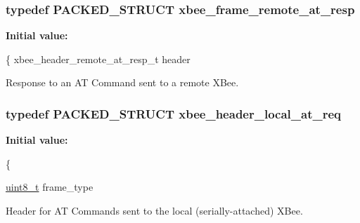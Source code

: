 \hypertarget{group__xbee__atcmd_ga5c11edcb9c5f6b11eec5d5d1c37cfbfd}{
\subsubsection[{xbee\-\_\-frame\-\_\-remote\-\_\-at\-\_\-resp}]{\setlength{\rightskip}{0pt plus 5cm}typedef {\bf P\-A\-C\-K\-E\-D\-\_\-\-S\-T\-R\-U\-C\-T} {\bf xbee\-\_\-frame\-\_\-remote\-\_\-at\-\_\-resp}}}\label{group__xbee__atcmd_ga5c11edcb9c5f6b11eec5d5d1c37cfbfd}
{\bfseries Initial value\-:}
\begin{DoxyCode}
\{
   xbee\_header\_remote\_at\_resp\_t header
\end{DoxyCode}


Response to an A\-T Command sent to a remote X\-Bee. 

\hypertarget{group__xbee__atcmd_ga9bf03869fc9022aadb223bfe0cbbce48}{
\subsubsection[{xbee\-\_\-header\-\_\-local\-\_\-at\-\_\-req}]{\setlength{\rightskip}{0pt plus 5cm}typedef {\bf P\-A\-C\-K\-E\-D\-\_\-\-S\-T\-R\-U\-C\-T} {\bf xbee\-\_\-header\-\_\-local\-\_\-at\-\_\-req}}}\label{group__xbee__atcmd_ga9bf03869fc9022aadb223bfe0cbbce48}
{\bfseries Initial value\-:}
\begin{DoxyCode}
\{
   
   \hyperlink{group__hal_gae1affc9ca37cfb624959c866a73f83c2}{uint8\_t}          frame\_type
\end{DoxyCode}


Header for A\-T Commands sent to the local (serially-\/attached) X\-Bee. 

